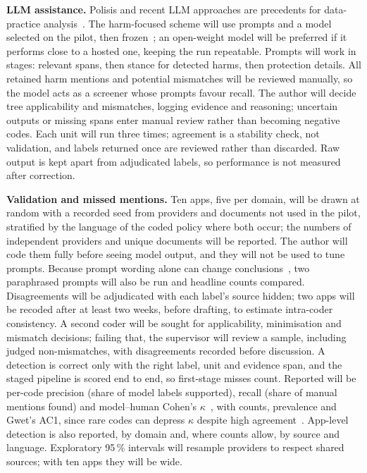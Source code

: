 \documentclass[sigconf,nonacm,natbib=false]{acmart}
\begin{document}
\textbf{LLM assistance.} Polisis and recent LLM approaches are precedents for
data-practice analysis~\parencite{harkous2018polisis,rodriguez2024llm}. The
harm-focused scheme will use prompts and a model selected on the pilot, then
frozen~\parencite{tornberg2024best}; an open-weight model will be preferred if
it performs close to a hosted one, keeping the run repeatable. Prompts will
work in stages: relevant spans, then stance for detected harms, then
protection details. All retained harm mentions and potential mismatches will
be reviewed manually, so the model acts as a screener whose prompts favour
recall. The author will decide tree applicability and mismatches, logging
evidence and reasoning; uncertain outputs or missing spans enter manual
review rather than becoming negative codes. Each unit will run three times;
agreement is a stability check, not validation, and labels returned once are
reviewed rather than discarded. Raw output is kept apart from adjudicated
labels, so performance is not measured after correction.

\textbf{Validation and missed mentions.} Ten apps, five per domain, will be
drawn at random with a recorded seed from providers and documents not used in
the pilot, stratified by the language of the coded policy where both occur;
the numbers of independent providers and unique documents will be reported.
The author will code them fully before seeing model output, and they will not
be used to tune prompts. Because prompt wording alone can change
conclusions~\parencite{baumann2025llm}, two paraphrased prompts will also be
run and headline counts compared. Disagreements will be adjudicated with each
label's source hidden; two apps will be recoded after at least two weeks,
before drafting, to estimate intra-coder consistency. A second coder will be
sought for applicability, minimisation and mismatch decisions; failing that,
the supervisor will review a sample, including judged non-mismatches, with
disagreements recorded before discussion. A detection is correct only with
the right label, unit and evidence span, and the staged pipeline is scored end
to end, so first-stage misses count. Reported will be per-code precision
(share of model labels supported), recall (share of manual mentions found)
and model--human Cohen's $\kappa$~\parencite{cohen1960coefficient}, with
counts, prevalence and Gwet's AC1, since rare codes can depress $\kappa$
despite high agreement~\parencite{feinstein1990high,gwet2008computing}.
App-level detection is also reported, by domain and, where counts allow, by
source and language. Exploratory 95\,\% intervals will resample providers to
respect shared sources; with ten apps they will be wide.
\end{document}
